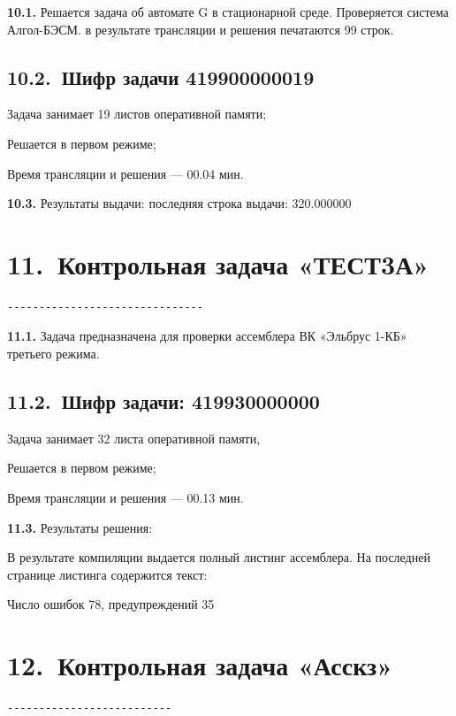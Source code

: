 \documentclass[11pt,a4paper]{article}
\begin{document}
\par\textbf{10.1.} Решается задача об автомате G в стационарной среде. Проверяется система Алгол-БЭСМ. в результате трансляции и решения печатаются 99 строк.\par
\subsection*{10.2.~Шифр задачи 419900000019}
Задача занимает 19 листов оперативной памяти;

Решается в первом режиме;

Время трансляции и решения --- 00.04 мин.

\par\textbf{10.3.} Результаты выдачи: последняя строка выдачи: 320.000000\par
\section*{11.~Контрольная задача «ТЕСТ3А»}
\begin{center}\small
\begin{BVerbatim}
-------------------------------
\end{BVerbatim}
\end{center}

\par\textbf{11.1.} Задача предназначена для проверки ассемблера ВК «Эльбрус 1-КБ» третьего режима.\par
\subsection*{11.2.~Шифр задачи: 419930000000}
Задача занимает 32 листа оперативной памяти,

Решается в первом режиме;

Время трансляции и решения --- 00.13 мин.

\par\textbf{11.3.} Результаты решения:\par
В результате компиляции выдается полный листинг ассемблера. На последней странице листинга содержится текст:

Число ошибок 78, предупреждений 35

\section*{12.~Контрольная задача «Асскз»}
\begin{center}\small
\begin{BVerbatim}
--------------------------
\end{BVerbatim}
\end{center}
\end{document}
